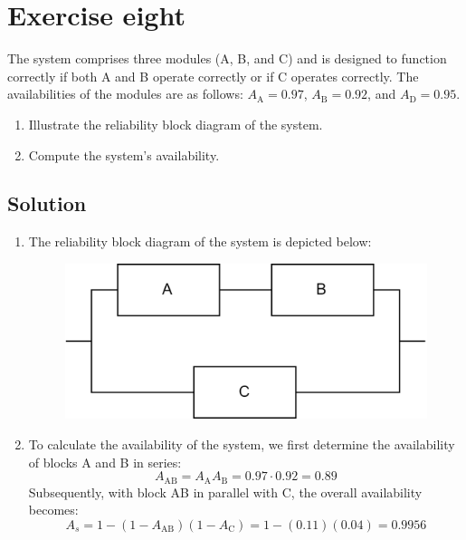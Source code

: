 \section{Exercise eight}

The system comprises three modules (A, B, and C) and is designed to function correctly if both A and B operate correctly or if C operates correctly.
The availabilities of the modules are as follows: $A_{\text{A}} = 0.97$, $A_{\text{B}} = 0.92$, and $A_{\text{D}} = 0.95$.
\begin{enumerate}
    \item Illustrate the reliability block diagram of the system.
    \item Compute the system's availability.
\end{enumerate}

\subsection*{Solution}
\begin{enumerate}
    \item The reliability block diagram of the system is depicted below:
        \begin{figure}[H]
            \centering
            \includegraphics[width=0.5\linewidth]{images/rbd1.png}
        \end{figure}
    \item To calculate the availability of the system, we first determine the availability of blocks A and B in series:
        \[A_{\text{AB}}=A_{\text{A}}A_{\text{B}}=0.97\cdot 0.92=0.89\]
        Subsequently, with block AB in parallel with C, the overall availability becomes:
        \[A_{s}=1-\left(1-A_{\text{AB}}\right)\left(1-A_{\text{C}}\right)=1-(0.11)(0.04)=0.9956\]
\end{enumerate}
